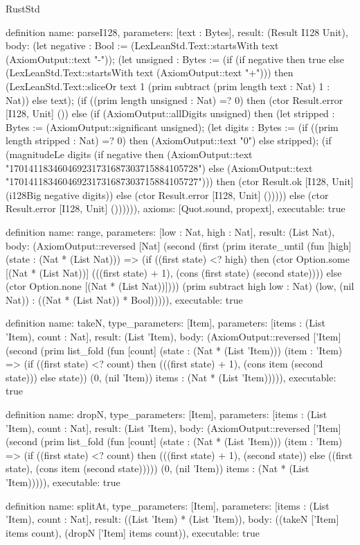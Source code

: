 \begin{lexlean}{RustStd}
\begin{semanticmodule}
definition{
  name: parseI128,
  parameters: [text : Bytes],
  result: (Result I128 Unit),
  body: (let negative : Bool := (LexLeanStd.Text::startsWith text (AxiomOutput::text "-")); (let unsigned : Bytes := (if (if negative then true else (LexLeanStd.Text::startsWith text (AxiomOutput::text "+"))) then (LexLeanStd.Text::sliceOr text 1 (prim subtract (prim length text : Nat) 1 : Nat)) else text); (if ((prim length unsigned : Nat) =? 0) then (ctor Result.error [I128, Unit] ()) else (if (AxiomOutput::allDigits unsigned) then (let stripped : Bytes := (AxiomOutput::significant unsigned); (let digits : Bytes := (if ((prim length stripped : Nat) =? 0) then (AxiomOutput::text "0") else stripped); (if (magnitudeLe digits (if negative then (AxiomOutput::text "170141183460469231731687303715884105728") else (AxiomOutput::text "170141183460469231731687303715884105727"))) then (ctor Result.ok [I128, Unit] (i128Big negative digits)) else (ctor Result.error [I128, Unit] ())))) else (ctor Result.error [I128, Unit] ()))))),
  axioms: [Quot.sound, propext],
  executable: true
}

definition{
  name: range,
  parameters: [low : Nat, high : Nat],
  result: (List Nat),
  body: (AxiomOutput::reversed [Nat] (second (first (prim iterate_until (fun [high] (state : (Nat * (List Nat))) => (if ((first state) <? high) then (ctor Option.some [(Nat * (List Nat))] (((first state) + 1), (cons (first state) (second state)))) else (ctor Option.none [(Nat * (List Nat))]))) (prim subtract high low : Nat) (low, (nil Nat)) : ((Nat * (List Nat)) * Bool))))),
  executable: true
}

definition{
  name: takeN,
  type_parameters: [Item],
  parameters: [items : (List 'Item), count : Nat],
  result: (List 'Item),
  body: (AxiomOutput::reversed ['Item] (second (prim list_fold (fun [count] (state : (Nat * (List 'Item))) (item : 'Item) => (if ((first state) <? count) then (((first state) + 1), (cons item (second state))) else state)) (0, (nil 'Item)) items : (Nat * (List 'Item))))),
  executable: true
}

definition{
  name: dropN,
  type_parameters: [Item],
  parameters: [items : (List 'Item), count : Nat],
  result: (List 'Item),
  body: (AxiomOutput::reversed ['Item] (second (prim list_fold (fun [count] (state : (Nat * (List 'Item))) (item : 'Item) => (if ((first state) <? count) then (((first state) + 1), (second state)) else ((first state), (cons item (second state))))) (0, (nil 'Item)) items : (Nat * (List 'Item))))),
  executable: true
}

definition{
  name: splitAt,
  type_parameters: [Item],
  parameters: [items : (List 'Item), count : Nat],
  result: ((List 'Item) * (List 'Item)),
  body: ((takeN ['Item] items count), (dropN ['Item] items count)),
  executable: true
}


\end{semanticmodule}
\end{lexlean}
